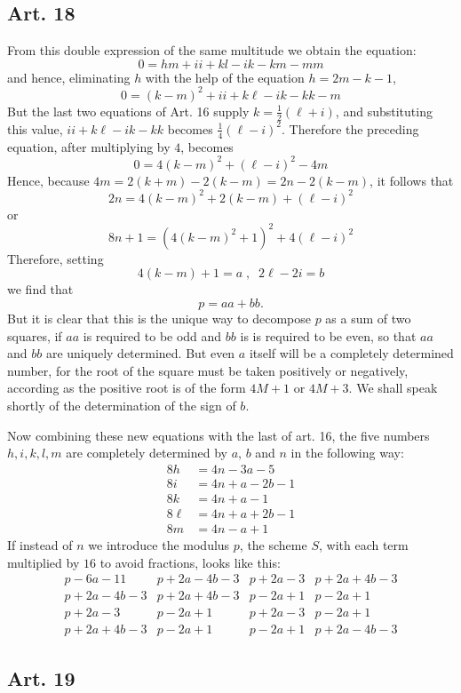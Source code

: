 \documentclass{book}
\theoremstyle{plain}
\theoremstyle{remark}
\begin{document}
\subsection*{Art. 18} 

From this double expression of the same multitude we obtain the equation:
\[ 0 = hm + ii + kl - ik - km - mm \]
and hence, eliminating $h$ with the help of the equation $h = 2m-k-1$,
\[ 0 = (k-m)^2 + ii + k\ell - ik - kk - m \]
But the last two equations of Art. 16 supply $ k = \tfrac{1}{2}(\ell+i)$, and substituting this value, $ii + k\ell - ik - kk$ becomes $\tfrac{1}{4}(\ell-i)^2$.  Therefore the preceding equation, after multiplying by $4$, becomes 
\[ 0 = 4 (k-m)^2 + (\ell-i)^2 - 4m \]
Hence, because $4m = 2(k+m)-2(k-m) = 2n - 2(k-m)$, it follows that 
\[ 2n = 4(k-m)^2 + 2(k-m) + (\ell-i)^2 \]
or 
\[ 8n+1 = (4(k-m)^2+1)^2 + 4 (\ell-i)^2 \]
Therefore, setting 
\[ 4(k-m) + 1 = a \; , \; \; 2\ell-2i = b \]
we find that 
\[ p = aa + bb. \]
But it is clear that this is the unique way to decompose $p$ as a sum of two squares, if $aa$ is required to be odd and $bb$ is is required to be even, so that $aa$ and $bb$ are uniquely determined.   But even $a$ itself will be a completely determined number, for the root of the square must be taken positively or negatively, according as the positive root is of the form $4M+1$ or $4M+3$.   We shall speak shortly of the determination of the sign of $b$.  

Now combining these new equations with the last of art. 16, the five numbers $h, i, k, l, m$  are completely determined by $a$, $b$ and $n$ in the following way:
\begin{align*}
8h&= 4n-3a-5 \\
8i &= 4n+a-2b-1 \\
8k&=4n+a-1 \\
8\ell &= 4n+a+2b-1 \\
8m &= 4n-a+1 
\end{align*}
If instead of $n$ we introduce the modulus $p$, the scheme $S$, with each term multiplied by $16$ to avoid fractions, looks like this:
\[
\begin{array}{l|l|l|l}
p-6a-11 & p+2a-4b-3&p+2a-3&p+2a+4b-3 \\
p+2a-4b-3&p+2a+4b-3&p-2a+1&p-2a+1 \\
p+2a-3 & p-2a+1& p+2a-3 & p-2a+1 \\
p+2a+4b-3&p-2a+1&p-2a+1&p+2a-4b-3 
\end{array}
\]

\subsection*{Art. 19}
\end{document}
